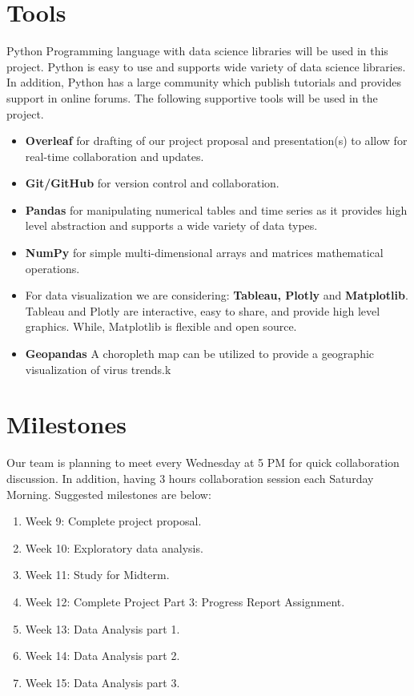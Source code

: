 \documentclass[manuscript,screen,review]{acmart}
\begin{document}
\section{Tools}
Python Programming language with data science libraries will be used in this project. Python is easy to use and supports wide variety of data science libraries. In addition, Python has a large community which publish tutorials and provides support in online forums.
The following supportive tools will be used in the project. 
\begin{itemize}
\item \textbf{Overleaf} for drafting of our project proposal and presentation(s) to allow for real-time collaboration and updates.
\item \textbf{Git/GitHub} for version control and collaboration.
\item \textbf{Pandas} for manipulating numerical tables and time series as it provides high level abstraction and supports a wide variety of data types.
\item \textbf{NumPy} for simple multi-dimensional arrays and matrices mathematical operations.
\item For data visualization we are considering: \textbf{Tableau, Plotly} and \textbf{Matplotlib}. Tableau and Plotly are interactive, easy to share, and provide high level graphics. While, Matplotlib is flexible and open source. 
\item \textbf{Geopandas} A choropleth map can be utilized to provide a geographic visualization of virus trends.k

\end{itemize}




\section{Milestones}
Our team is planning to meet every Wednesday at 5 PM for quick collaboration discussion. In addition, having 3 hours collaboration session each Saturday Morning. Suggested milestones are below:

\begin{enumerate}
\item Week 9: Complete project proposal.
\item Week 10: Exploratory data analysis.
\item Week 11: Study for Midterm.
\item Week 12: Complete Project Part 3: Progress Report Assignment.
\item Week 13: Data Analysis part 1.
\item Week 14: Data Analysis part 2.
\item Week 15: Data Analysis part 3.
\end{enumerate}
\end{document}
